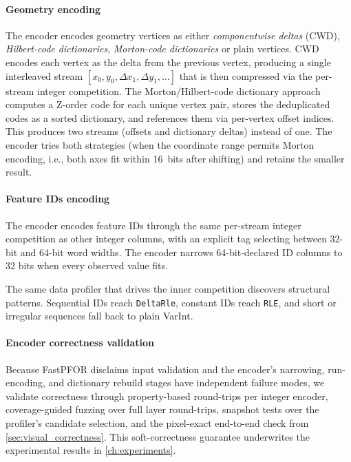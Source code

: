 \paragraph{Geometry encoding}
The encoder encodes geometry vertices as either \emph{componentwise deltas} (CWD), \emph{Hilbert-code dictionaries}, \emph{Morton-code dictionaries} or plain vertices.
CWD encodes each vertex as the delta from the previous vertex, producing a single interleaved stream $[x_0, y_0, \Delta x_1, \Delta y_1, \ldots]$ that is then compressed via the per-stream integer competition.
The Morton/Hilbert-code dictionary approach computes a Z-order code for each unique vertex pair, stores the deduplicated codes as a sorted dictionary, and references them via per-vertex offset indices.
This produces two streams (offsets and dictionary deltas) instead of one.
The encoder tries both strategies (when the coordinate range permits Morton encoding, i.e., both axes fit within 16~bits after shifting) and retains the smaller result.

\paragraph{Feature IDs encoding}
The encoder encodes feature IDs through the same per-stream integer competition as other integer columns, with an explicit tag selecting between 32-bit and 64-bit word widths.
The encoder narrows 64-bit-declared ID columns to 32 bits when every observed value fits.

The same data profiler that drives the inner competition discovers structural patterns.
Sequential IDs reach \texttt{DeltaRle}, constant IDs reach \texttt{\ac{RLE}}, and short or irregular sequences fall back to plain \ac{VarInt}.

\paragraph{Encoder correctness validation}\label{par:encoder_validation}
Because \ac{FastPFOR} disclaims input validation and the encoder's narrowing, run-encoding, and dictionary rebuild stages have independent failure modes, we validate correctness through property-based round-trips per integer encoder, coverage-guided fuzzing over full layer round-trips, snapshot tests over the profiler's candidate selection, and the pixel-exact end-to-end check from \cref{sec:visual_correctness}.
This soft-correctness guarantee underwrites the experimental results in \cref{ch:experiments}.

